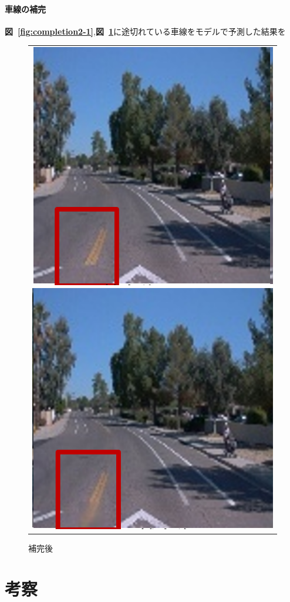 \documentclass[a4j, 11pt]{jreport}
\newcommand{\figref}[1]{\textbf{図~\ref{#1}}}
\begin{document}
\subsubsection{車線の補完}
\figref{fig:completion2-1},\figref{fig:completion2-2}に途切れている車線をモデルで予測した結果を
\begin{figure}[H]
	\centering
	  \begin{tabular}{c}
		\begin{minipage}{0.50\hsize}
		  \centering
			\includegraphics[scale=0.5]
			{images/result/completion/result2-1.png}
			\caption{補完前}
			\label{fig:completion2-1}
		\end{minipage}
   
   
		\begin{minipage}{0.50\hsize}
		  \centering
			\includegraphics[scale=0.5]
			{images/result/completion/result2-2.png}
			\caption{補完後}
			\label{fig:completion2-2}
		\end{minipage} \\
	\end{tabular}
\end{figure}\chapter{考察}
\end{document}
